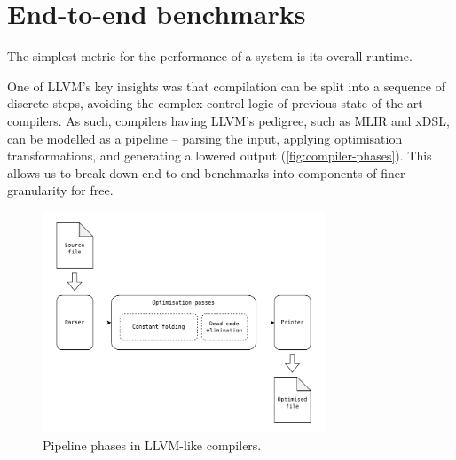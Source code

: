 \section{End-to-end benchmarks}

The simplest metric for the performance of a system is its overall runtime.

One of LLVM's key insights was that compilation can be split into a sequence of discrete steps, avoiding the complex control logic of previous state-of-the-art compilers.
As such, compilers having LLVM's pedigree, such as MLIR and xDSL, can be modelled as a pipeline -- parsing the input, applying optimisation transformations, and generating a lowered output (\autoref{fig:compiler-phases}).
This allows us to break down end-to-end benchmarks into components of finer granularity for free.


\begin{figure}
    \centering
    \includegraphics[width=0.75\textwidth]{images/13_measuring_compiler_performance/compiler_phases.drawio.pdf}
    \caption{Pipeline phases in LLVM-like compilers.}
    \label{fig:compiler-phases}
\end{figure}











